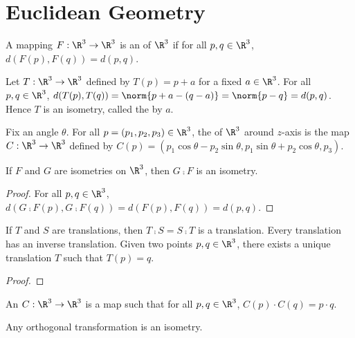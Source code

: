 \documentclass[10pt]{article}
\begin{document}
\section{Euclidean Geometry}
\begin{definition}
    A mapping $F:{\R}^{3}\to{\R}^{3}$ is an  of ${\R}^{3}$ if for all $p,q\in{\R}^{3}$, $d(F(p),F(q))=d(p,q)$.
\end{definition}
\begin{example}
    Let $T:{\R}^{3}\to{\R}^{3}$ defined by $T(p)=p+a$ for a fixed $a\in{\R}^{3}$. For all $p,q\in{\R}^{3}$, $d(T(p),T(q))=\norm{p+a-(q-a)}=\norm{p-q}=d(p,q)$. Hence $T$ is an isometry, called the  by $a$.
\end{example}
\begin{example}
    Fix an angle $\theta$. For all $p=({p}_{1},{p}_{2},{p}_{3})\in{\R}^{3}$, the  of ${\R}^{3}$ around $z$-axis is the map $C:{\R}^{3}\to{\R}^{3}$ defined by $C(p)=({p}_{1}\cos\theta-{p}_{2}\sin\theta,{p}_{1}\sin\theta+{p}_{2}\cos\theta,{p}_{3})$.
\end{example}
\begin{proposition}
    If $F$ and $G$ are isometries on ${\R}^{3}$, then $G\comp F$ is an isometry.
\end{proposition}
\begin{proof}
    For all $p,q\in{\R}^{3}$, $d(G\comp F(p),G\comp F(q))=d(F(p),F(q))=d(p,q)$.
\end{proof}
\begin{proposition}
    If $T$ and $S$ are translations, then $T\comp S=S\comp T$ is a translation. Every translation has an inverse translation. Given two points $p,q\in{\R}^{3}$, there exists a unique translation $T$ such that $T(p)=q$.
\end{proposition}
\begin{proof}
    
\end{proof}
\begin{definition}
    An  $C:{\R}^{3}\to{\R}^{3}$ is a map such that for all $p,q\in{\R}^{3}$, $C(p)\cdot C(q)=p\cdot q$.
\end{definition}
\begin{proposition}
    Any orthogonal transformation is an isometry.
\end{proposition}

\hindex
\end{document}
